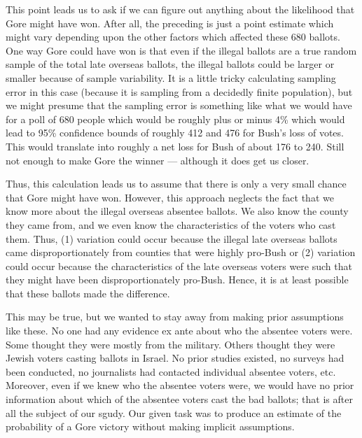 \documentclass[11pt]{article}
\begin{document}
\begin{enumerate}
{    This point leads us to ask if we can figure out anything about the
    likelihood that Gore might have won.  After all, the preceding is
    just a point estimate which might vary depending upon the other
    factors which affected these 680 ballots.  One way Gore could have
    won is that even if the illegal ballots are a true random sample
    of the total late overseas ballots, the illegal ballots could be
    larger or smaller because of sample variability.  It is a little
    tricky calculating sampling error in this case (because it is
    sampling from a decidedly finite population), but we might presume
    that the sampling error is something like what we would have for a
    poll of 680 people which would be roughly plus or minus 4\% which
    would lead to 95\% confidence bounds of roughly 412 and 476 for
    Bush's loss of votes.  This would translate into roughly a net
    loss for Bush of about 176 to 240.  Still not enough to make Gore
    the winner --- although it does get us closer. 
    
    Thus, this calculation leads us to assume that there is only a
    very small chance that Gore might have won.  However, this
    approach neglects the fact that we know more about the illegal
    overseas absentee ballots.  We also know the county they came
    from, and we even know the characteristics of the voters who cast
    them.  Thus, (1) variation could occur because the illegal late
    overseas ballots came disproportionately from counties that were
    highly pro-Bush or (2) variation could occur because the
    characteristics of the late overseas voters were such that they
    might have been disproportionately pro-Bush.  Hence, it is at
    least possible that these ballots made the difference.}
   
  
  This may be true, but we wanted to stay away from making prior
  assumptions like these.  No one had any evidence ex ante about who
  the absentee voters were.  Some thought they were mostly from the
  military.  Others thought they were Jewish voters casting ballots in
  Israel.  No prior studies existed, no surveys had been conducted, no
  journalists had contacted individual absentee voters, etc.
  Moreover, even if we knew who the absentee voters were, we would
  have no prior information about which of the absentee voters cast
  the bad ballots; that is after all the subject of our sgudy.  Our
  given task was to produce an estimate of the probability of a Gore
  victory without making implicit assumptions.
  

\end{enumerate}
\end{document}
